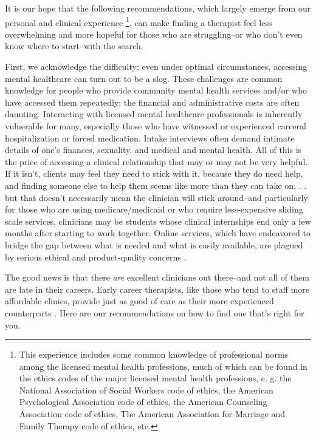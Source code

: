 \documentclass[12pt,letterpaper]{book}
\begin{document}
It is our hope that the following recommendations, which largely emerge from our personal and clinical experience \footnote{This experience includes some common knowledge of professional norms among the licensed mental health professions, much of which can be found in the ethics codes of the major licensed mental health professions, e. g. the National Association of Social Workers code of ethics, the American Psychological Association code of ethics, the American Counseling Association code of ethics, The American Association for Marriage and Family Therapy code of ethics, etc.}, can make finding a therapist feel less overwhelming and more hopeful for those who are struggling--or who don't even know where to start--with the search.

First, we acknowledge the difficulty: even under optimal circumstances, accessing mental healthcare can turn out to be a slog. These challenges are common knowledge for people who provide community mental health services and/or who have accessed them repeatedly: the financial and administrative costs are often daunting. Interacting with licensed mental healthcare professionals is inherently vulnerable for many, especially those who have witnessed or experienced carceral hospitalization or forced medication. Intake interviews often demand intimate details of one's finances, sexuality, and medical and mental health. All of this is the price of accessing a clinical relationship that may or may not be very helpful. If it isn't, clients may feel they need to stick with it, because they do need help, and finding someone else to help them seems like more than they can take on. . . but that doesn't necessarily mean the clinician will stick around--and particularly for those who are using medicare/medicaid or who require less-expensive sliding scale services, clinicians may be students whose clinical internships end only a few months after starting to work together. Online services, which have endeavored to bridge the gap between what is needed and what is easily available, are plagued by serious ethical and product-quality concerns \cite{betterhelp1,betterhelp2,betterhelp3,talkspace1,doneglobal1}.

The good news is that there \textit{are} excellent clinicians out there--and not all of them are late in their careers. Early career therapists, like those who tend to staff more affordable clinics, provide just as good of care as their more experienced counterparts \cite{goldberg2016psychotherapists}. Here are our recommendations on how to find one that's right for you.
\end{document}
